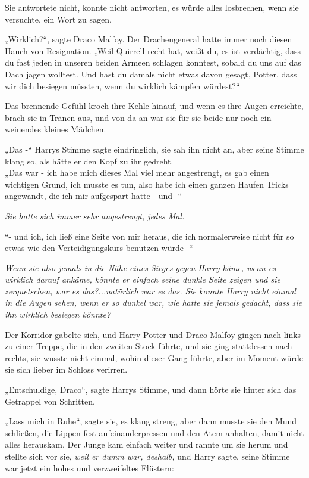 {Sie antwortete nicht, konnte nicht antworten, es würde alles losbrechen, wenn sie versuchte, ein Wort zu sagen.

„Wirklich?“, sagte Draco Malfoy. Der Drachengeneral hatte immer noch diesen Hauch von Resignation. „Weil Quirrell recht hat, weißt du, es ist verdächtig, dass du fast jeden in unseren beiden Armeen schlagen konntest, sobald du uns auf das Dach jagen wolltest. Und hast du damals nicht etwas davon gesagt, Potter, dass wir dich besiegen müssten, wenn du wirklich kämpfen würdest?“

Das brennende Gefühl kroch ihre Kehle hinauf, und wenn es ihre Augen erreichte, brach sie in Tränen aus, und von da an war sie für sie beide nur noch ein weinendes kleines Mädchen.

„Das -“ Harrys Stimme sagte eindringlich, sie sah ihn nicht an, aber seine Stimme klang so, als hätte er den Kopf zu ihr gedreht.\\ „Das war - ich habe mich dieses Mal viel mehr angestrengt, es gab einen wichtigen Grund, ich musste es tun, also habe ich einen ganzen Haufen Tricks angewandt, die ich mir aufgespart hatte - und -“

\emph{Sie hatte sich immer sehr angestrengt, jedes Mal.}

“- und ich, ich ließ eine Seite von mir heraus, die ich normalerweise nicht für so etwas wie den Verteidigungskurs benutzen würde -“

\emph{Wenn sie also jemals in die Nähe eines Sieges gegen Harry käme, wenn es wirklich darauf ankäme, könnte er einfach seine dunkle Seite zeigen und sie zerquetschen, war es das?...natürlich war es das. Sie konnte Harry nicht einmal in die Augen sehen, wenn er so dunkel war, wie hatte sie jemals gedacht, dass sie ihn wirklich besiegen könnte?}

Der Korridor gabelte sich, und Harry Potter und Draco Malfoy gingen nach links zu einer Treppe, die in den zweiten Stock führte, und sie ging stattdessen nach rechts, sie wusste nicht einmal, wohin dieser Gang führte, aber im Moment würde sie sich lieber im Schloss verirren.

„Entschuldige, Draco“, sagte Harrys Stimme, und dann hörte sie hinter sich das Getrappel von Schritten.

„Lass mich in Ruhe“, sagte sie, es klang streng, aber dann musste sie den Mund schließen, die Lippen fest aufeinanderpressen und den Atem anhalten, damit nicht alles herauskam. Der Junge kam einfach weiter und rannte um sie herum und stellte sich vor sie, \emph{weil er dumm war, deshalb,} und Harry sagte, seine Stimme\\ war jetzt ein hohes und verzweifeltes Flüstern:

}
